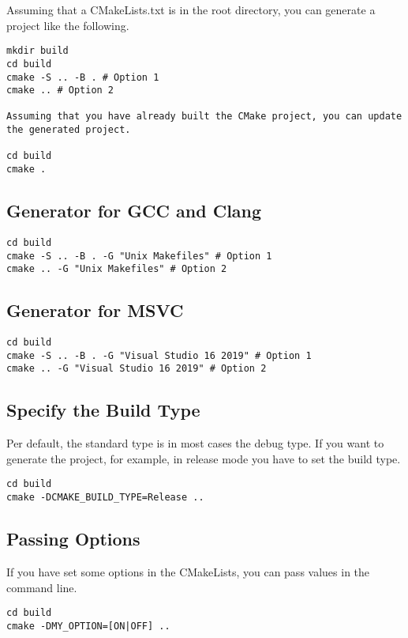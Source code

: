 \documentclass[openany]{report}
\begin{document}
Assuming that a CMakeLists.txt is in the root directory, you can generate a project like the following.

\begin{verbatim}
mkdir build
cd build
cmake -S .. -B . # Option 1
cmake .. # Option 2

Assuming that you have already built the CMake project, you can update the generated project.

cd build
cmake .
\end{verbatim}

\subsection{Generator for GCC and Clang}

\begin{verbatim}
cd build
cmake -S .. -B . -G "Unix Makefiles" # Option 1
cmake .. -G "Unix Makefiles" # Option 2
\end{verbatim}

\subsection{Generator for MSVC}

\begin{verbatim}
cd build
cmake -S .. -B . -G "Visual Studio 16 2019" # Option 1
cmake .. -G "Visual Studio 16 2019" # Option 2
\end{verbatim}

\subsection{Specify the Build Type}

Per default, the standard type is in most cases the debug type.
If you want to generate the project, for example, in release mode you have to set the build type.

\begin{verbatim}
cd build
cmake -DCMAKE_BUILD_TYPE=Release ..
\end{verbatim}

\subsection{Passing Options}

If you have set some options in the CMakeLists, you can pass values in the command line.

\begin{verbatim}
cd build
cmake -DMY_OPTION=[ON|OFF] ..
\end{verbatim}
\end{document}
